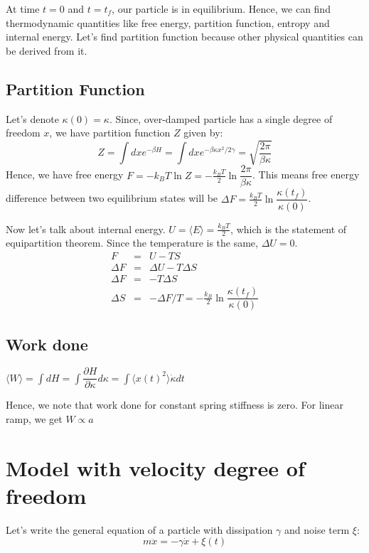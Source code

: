\documentclass[11pt,a4paper]{article}
\begin{document}
At time $t=0$ and $t=t_f$, our particle is in equilibrium. Hence, we can find thermodynamic quantities like free energy, partition function, entropy and internal energy. Let's find partition function because other physical quantities can be derived from it.

\subsection*{Partition Function}
Let's denote $\kappa(0)= \kappa$. Since, over-damped particle has a single degree of freedom $x$, we have partition function $Z$ given by:
\begin{equation}
Z = \int dx e^{-\beta H}= \int dx e^{-\beta \kappa  x^2/2 \gamma}= \sqrt{\dfrac{2  \pi}{\beta \kappa}}
\end{equation}
Hence, we have free energy $F = -k_B T \ln Z=-\frac{k_B T}{2} \ln \dfrac{2   \pi}{\beta \kappa} $. This means free energy difference between two equilibrium states will be $\Delta F =\frac{k_B T}{2} \ln \dfrac{\kappa(t_f)}{\kappa(0)} $.

Now let's talk about internal energy. $U= \langle E \rangle = \frac{k_B T}{2}$, which is the statement of equipartition theorem. Since the temperature is the same, $\Delta U=0$.
\begin{eqnarray*}
 F&=& U-TS\\
 \Delta F &=& \Delta U-T \Delta S \\
  \Delta F &=& -T \Delta S \\
  \Delta S &=& - \Delta F/ T= -\frac{k_B}{2} \ln \dfrac{\kappa(t_f)}{\kappa(0)} 
\end{eqnarray*}

\subsection*{Work done}
$\langle W \rangle= \int dH = \int \dfrac{\partial H}{\partial \kappa} d\kappa= \int \langle x(t)^2 \rangle \dot{\kappa} dt$


Hence, we note that work done for constant spring stiffness is zero. For linear ramp, we get $W \propto a$

\appendix

\section{Model with velocity degree of freedom}
Let's write the general equation of a particle with dissipation $\gamma$ and noise term $\xi$:
\begin{equation}
m \ddot{x}= -\gamma \dot{x} + \xi(t)
\end{equation}
\end{document}
